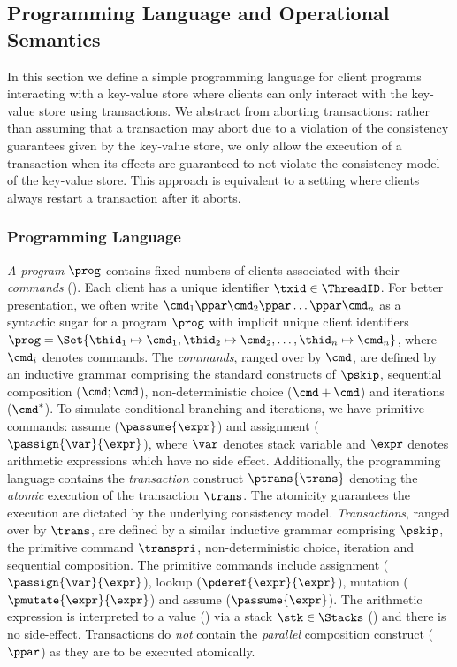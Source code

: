 \subsection{Programming Language and Operational Semantics}

In this section we define a simple programming language for client programs interacting with a key-value store where clients can only interact with the key-value store using transactions. 
We abstract from aborting transactions: rather than assuming that a transaction may abort due to a violation of the consistency guarantees given by the key-value store, we only allow the execution of a transaction when its effects are guaranteed to not violate the consistency model of the key-value store. This approach is equivalent to a setting where clients always restart a transaction after it aborts.
 
\subsubsection{Programming Language}

\emph{A program} \( \prog \) contains fixed numbers of clients associated with their \emph{commands} ().
Each client has a unique identifier \( \txid \in \ThreadID \).
For better presentation, we often write \( \cmd_{1} \ppar \cmd_{2} \ppar \dots \ppar \cmd_{n}\) as a syntactic sugar for a program \( \prog \) with implicit unique client identifiers \( \prog = \Set{\thid_{1} \mapsto \cmd_{1}, \thid_{2} \mapsto \cmd_{2}, \dots, \thid_{n} \mapsto \cmd_{n}  }\), where \( \cmd_i\) denotes commands.
The \emph{commands}, ranged over by $\cmd$, are defined by an inductive grammar comprising the standard constructs of $\pskip$, sequential composition ($\cmd; \cmd$), non-deterministic choice ($\cmd+\cmd$) and iterations ($\cmd^*$).
To simulate conditional branching and iterations, we have primitive commands: assume (\( \passume{\expr}\)) and assignment (\( \passign{\var}{\expr} \)), where \( \var \) denotes stack variable and \( \expr \) denotes arithmetic expressions which have no side effect.
Additionally, the programming language contains the \emph{transaction} construct $\ptrans{\trans}$ denoting the \emph{atomic} execution of the transaction $\trans$. 
The atomicity guarantees the execution are dictated by the underlying consistency model.
\emph{Transactions}, ranged over by $\trans$, are defined by a similar inductive grammar comprising $\pskip$, the primitive command \( \transpri \), non-deterministic choice, iteration and sequential composition.
The primitive commands include assignment (\( \passign{\var}{\expr}\)), lookup (\( \pderef{\expr}{\expr}\)), mutation (\( \pmutate{\expr}{\expr}\)) and assume (\( \passume{\expr}\)). 
The arithmetic expression is interpreted to a value () via a stack \( \stk \in \Stacks \) () and there is no side-effect.
Transactions do \emph{not} contain the \emph{parallel} composition construct ($\ppar$) as they are to be executed atomically.

